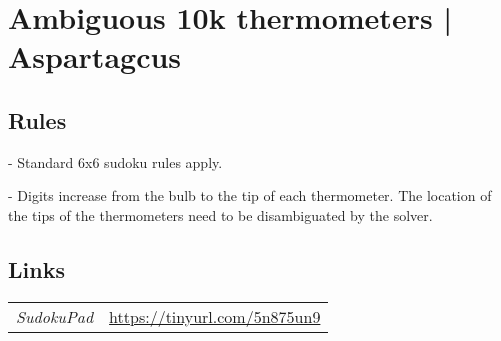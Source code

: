 \section[Ambiguous 10k thermometers | Aspartagcus {[\emph{Thermo Sudoku}]}]{Ambiguous 10k thermometers | {\normalfont Aspartagcus}}
\label{sec:11-ambiguous-10k-thermometers-aspartagcus}

\subsection*{Rules}
\begin{markdown}
- Standard 6x6 sudoku rules apply.

- Digits increase from the bulb to the tip of each thermometer. The location of the tips of the thermometers need to be disambiguated by the solver.
\end{markdown}
\subsection*{Links}
\begin{tabularx}{\textwidth}{l X}
\emph{SudokuPad} & \url{https://tinyurl.com/5n875un9} \\
\end{tabularx}
\pagebreak
